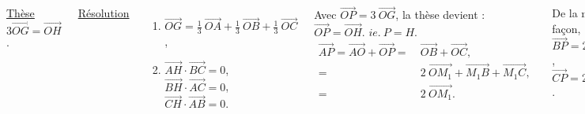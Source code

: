 \documentclass[10pt]{beamer}
\newcommand{\vect}[1] {
  \overrightarrow{#1}}
\begin{document}
{\begin{columns}[t]
\begin{tcolorbox}[basic]
				    \underline{Thèse} \\
				    \smallskip
				    $3\vect{OG}=\vect{OH}$.
				    \end{tcolorbox}
		
		
		\centering
		
		\underline{Résolution}\\ \flushleft
		
		\onslide<+->\begin{enumerate}
			    \item $\vect{OG} = \frac{1}{3}\ \vect{OA} + \frac{1}{3}\ \vect{OB} + \frac{1}{3}\ \vect{OC}$, \\[1em]
			    \item $\vect{AH}\cdot\vect{BC}=0$, \\[0.5em]
				  $\vect{BH}\cdot\vect{AC}=0$, \\[0.5em] 
				  $\vect{CH}\cdot\vect{AB}=0$.
			    \end{enumerate}	\bigskip
		
		Avec $\vect{OP}=3\ \vect{OG}$, la thèse devient : \\ \medskip
		$\vect{OP}=\vect{OH}$. $ie.\ P=H.$ \\ \bigskip
		\vspace{-4mm}
		\onslide<+->\begin{align*}
			    \vect{AP}=\vect{AO}+\vect{OP}=\ & \vect{OB}+\vect{OC}, \\[0.3em]
							 =\ & 2\ \vect{OM_1} + \vect{M_1B} + \vect{M_1C}, \\[0.3em]
							 =\ & 2\ \vect{OM_1}.
			    \end{align*} 
		\smallskip	    
		
		\onslide<+->De la même façon, \\ \medskip
		$\vect{BP}= 2\ \vect{OM_2}$, \onslide<+-> $\vect{CP}= 2\ \vect{OM_3}$.
		
		
	
					
		
		\bigskip
		
		
	   \end{columns} 
    }
\end{document}
